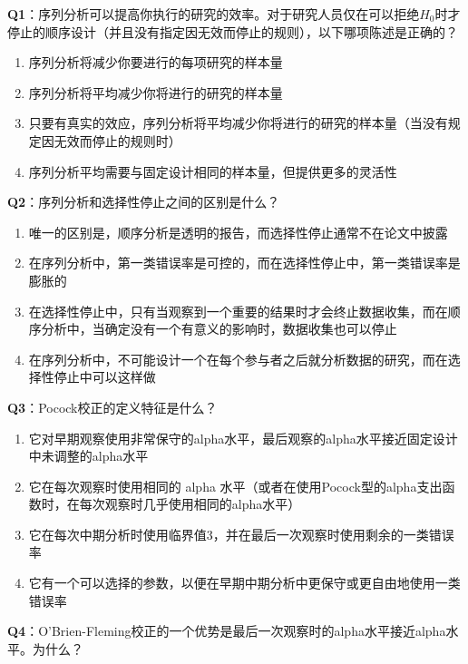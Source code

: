 \documentclass[
  letterpaper,
  DIV=11,
  numbers=noendperiod]{scrreprt}
\providecommand{\tightlist}{%
  \setlength{\itemsep}{0pt}\setlength{\parskip}{0pt}}\usepackage{longtable,booktabs,array}
\begin{document}
\textbf{Q1}：序列分析可以提高你执行的研究的效率。对于研究人员仅在可以拒绝\(H_0\)时才停止的顺序设计（并且没有指定因无效而停止的规则），以下哪项陈述是正确的？

\begin{enumerate}
\def\labelenumi{\Alph{enumi})}
\tightlist
\item
  序列分析将减少你要进行的每项研究的样本量
\item
  序列分析将平均减少你将进行的研究的样本量
\item
  只要有真实的效应，序列分析将平均减少你将进行的研究的样本量（当没有规定因无效而停止的规则时）
\item
  序列分析平均需要与固定设计相同的样本量，但提供更多的灵活性
\end{enumerate}

\textbf{Q2}：序列分析和选择性停止之间的区别是什么？

\begin{enumerate}
\def\labelenumi{\Alph{enumi})}
\tightlist
\item
  唯一的区别是，顺序分析是透明的报告，而选择性停止通常不在论文中披露
\item
  在序列分析中，第一类错误率是可控的，而在选择性停止中，第一类错误率是膨胀的
\item
  在选择性停止中，只有当观察到一个重要的结果时才会终止数据收集，而在顺序分析中，当确定没有一个有意义的影响时，数据收集也可以停止
\item
  在序列分析中，不可能设计一个在每个参与者之后就分析数据的研究，而在选择性停止中可以这样做
\end{enumerate}

\textbf{Q3}：Pocock校正的定义特征是什么？

\begin{enumerate}
\def\labelenumi{\Alph{enumi})}
\tightlist
\item
  它对早期观察使用非常保守的alpha水平，最后观察的alpha水平接近固定设计中未调整的alpha水平
\item
  它在每次观察时使用相同的 alpha
  水平（或者在使用Pocock型的alpha支出函数时，在每次观察时几乎使用相同的alpha水平）
\item
  它在每次中期分析时使用临界值3，并在最后一次观察时使用剩余的一类错误率
\item
  它有一个可以选择的参数，以便在早期中期分析中更保守或更自由地使用一类错误率
\end{enumerate}

\textbf{Q4}：O'Brien-Fleming校正的一个优势是最后一次观察时的alpha水平接近alpha水平。为什么？
\end{document}
